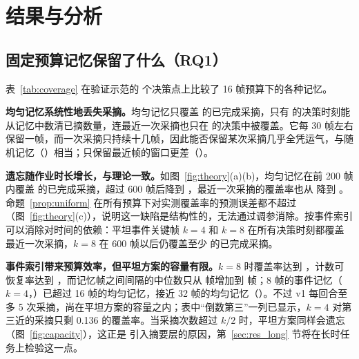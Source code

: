\section{结果与分析}
\label{sec:results}

\subsection{固定预算记忆保留了什么（RQ1）}
\label{sec:res_memory}
表~\ref{tab:coverage} 在验证示范的  个决策点上比较了 16 帧预算下的各种记忆。

\textbf{均匀记忆系统性地丢失采摘。}均匀记忆只覆盖  的已完成采摘，只有  的决策时刻能从记忆中数清已摘数量，连最近一次采摘也只在  的决策中被覆盖。它每 30 帧左右保留一帧，而一次采摘只持续十几帧，因此能否保留某次采摘几乎全凭运气，与随机记忆（）相当；只保留最近帧的窗口更差（）。

\textbf{遗忘随作业时长增长，与理论一致。}如图~\ref{fig:theory}(a)(b)，均匀记忆在前 200 帧内覆盖  的已完成采摘，超过 600 帧后降到 ，最近一次采摘的覆盖率也从  降到 。命题~\ref{prop:uniform} 在所有预算下对实测覆盖率的预测误差都不超过 （图~\ref{fig:theory}(c)），说明这一缺陷是结构性的，无法通过调参消除。按事件索引可以消除对时间的依赖：平坦事件关键帧 $k=4$ 和 $k=8$ 在所有决策时刻都覆盖最近一次采摘，$k=8$ 在 600 帧以后仍覆盖至少  的已完成采摘。

\textbf{事件索引带来预算效率，但平坦方案的容量有限。}$k=8$ 时覆盖率达到 ，计数可恢复率达到 ，而记忆帧之间间隔的中位数只从  帧增加到  帧；8 帧的事件记忆（$k=4$，）已超过 16 帧的均匀记忆，接近 32 帧的均匀记忆（）。不过 v1 每回合至多 5 次采摘，尚在平坦方案的容量之内；表中“倒数第三”一列已显示，$k=4$ 对第三近的采摘只剩 0.136 的覆盖率。当采摘次数超过 $k/2$ 时，平坦方案同样会遗忘（图~\ref{fig:capacity}），这正是 \hem{} 引入摘要层的原因，第~\ref{sec:res_long} 节将在长时任务上检验这一点。

